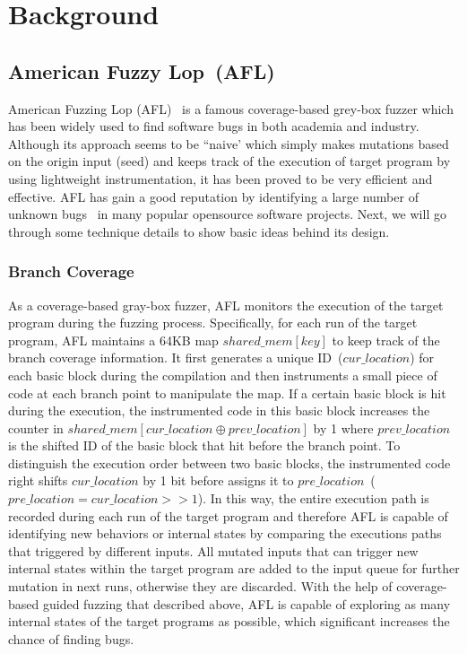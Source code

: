 \section{Background}\label{sec:background}

\subsection{American Fuzzy Lop~(AFL)}
American Fuzzing Lop (AFL)~\cite{aflweb} is a famous coverage-based grey-box fuzzer which has been widely used to find software bugs in both academia and industry.  Although its approach seems to be ``naive'  which simply makes mutations based on the origin input (seed) and keeps track of the execution of target program by using lightweight instrumentation, it has been proved to be very efficient and effective. AFL has gain a good reputation by identifying a large number of unknown bugs~\cite{aflweb} in many popular opensource software projects. Next, we will go through some technique details to show basic ideas behind its design. 

\subsubsection{\bf{Branch Coverage}}

As a coverage-based gray-box fuzzer, AFL monitors the execution of the target program during the fuzzing process. Specifically, for each run of the target program, AFL maintains a 64KB map $shared\_mem[key]$ to keep track of the branch coverage information. It first generates a unique ID~($cur\_location$) for each basic block during the compilation and then instruments a small piece of code at each branch point to manipulate the map. If a certain basic block is hit during the execution, the instrumented code in this basic block increases the counter in \texttt{$shared\_mem[cur\_location \oplus prev\_location]$} by 1 where $prev\_location$ is the shifted ID of the basic block that hit before the branch point. To distinguish the execution order between two basic blocks, the instrumented code right shifts $cur\_location$ by 1 bit before assigns it to $pre\_location$~($pre\_location = cur\_location >> 1$). In this way, the entire execution path is recorded during each run of the target program and therefore AFL is capable of identifying new behaviors or internal states by comparing the executions paths that triggered by different inputs. All mutated inputs that can trigger new internal states within the target program are added to the input queue for further mutation in next runs, otherwise they are discarded. With the help of coverage-based guided fuzzing that described above, AFL is capable of exploring as many internal states of the target programs as possible, which significant increases the chance of finding bugs. 

